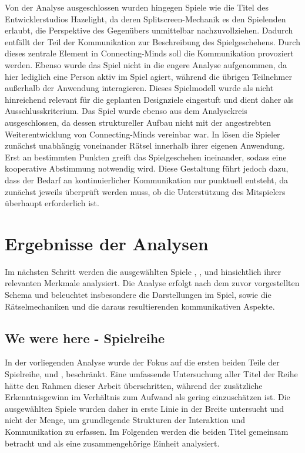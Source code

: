 Von der Analyse ausgeschlossen wurden hingegen Spiele wie die Titel des Entwicklerstudios Hazelight, da deren Splitscreen-Mechanik es den Spielenden erlaubt, die Perspektive des Gegenübers unmittelbar nachzuvollziehen. Dadurch entfällt der Teil der Kommunikation zur Beschreibung des Spielgeschehens. Durch dieses zentrale Element in Connecting-Minds soll die Kommunikation provoziert werden. Ebenso wurde das Spiel  nicht in die engere Analyse aufgenommen, da hier lediglich eine Person aktiv im Spiel agiert, während die übrigen Teilnehmer außerhalb der Anwendung interagieren. Dieses Spielmodell wurde als nicht hinreichend relevant für die geplanten Designziele eingestuft und dient daher als Ausschlusskriterium. Das Spiel  wurde ebenso aus dem Analysekreis ausgeschlossen, da dessen struktureller Aufbau nicht mit der angestrebten Weiterentwicklung von Connecting-Minds vereinbar war. In  lösen die Spieler zunächst unabhängig voneinander Rätsel innerhalb ihrer eigenen Anwendung. Erst an bestimmten Punkten greift das Spielgeschehen ineinander, sodass eine kooperative Abstimmung notwendig wird. Diese Gestaltung führt jedoch dazu, dass der Bedarf an kontinuierlicher Kommunikation nur punktuell entsteht, da zunächst jeweils überprüft werden muss, ob die Unterstützung des Mitspielers überhaupt erforderlich ist.

\section{Ergebnisse der Analysen}

Im nächsten Schritt werden die ausgewählten Spiele , ,  und  hinsichtlich ihrer relevanten Merkmale analysiert. Die Analyse erfolgt nach dem zuvor vorgestellten Schema und beleuchtet insbesondere die Darstellungen im Spiel, sowie die Rätselmechaniken und die daraus resultierenden kommunikativen Aspekte.

\subsection{We were here - Spielreihe}
In der vorliegenden Analyse wurde der Fokus auf die ersten beiden Teile der Spielreihe,  und , beschränkt. Eine umfassende Untersuchung aller Titel der Reihe hätte den Rahmen dieser Arbeit überschritten, während der zusätzliche Erkenntnisgewinn im Verhältnis zum Aufwand als gering einzuschätzen ist. Die ausgewählten Spiele wurden daher in erste Linie in der Breite untersucht und nicht der Menge, um grundlegende Strukturen der Interaktion und Kommunikation zu erfassen. Im Folgenden werden die beiden Titel gemeinsam betracht und als eine zusammengehörige Einheit analysiert.

